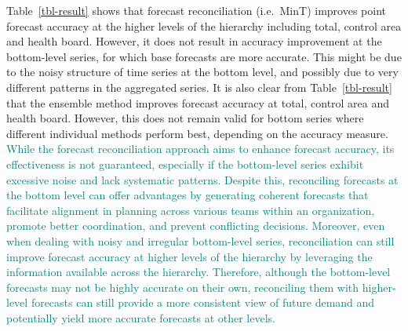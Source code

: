 \documentclass[
  authoryear,
  preprint,
  3p]{elsarticle}
\begin{document}
Table~\ref{tbl-result} shows that forecast reconciliation (i.e.~MinT)
improves point forecast accuracy at the higher levels of the hierarchy
including total, control area and health board. However, it does not
result in accuracy improvement at the bottom-level series, for which
base forecasts are more accurate. This might be due to the noisy
structure of time series at the bottom level, and possibly due to very
different patterns in the aggregated series. It is also clear from
Table~\ref{tbl-result} that the ensemble method improves forecast
accuracy at total, control area and health board. However, this does not
remain valid for bottom series where different individual methods
perform best, depending on the accuracy measure.
\textcolor{teal}{While the forecast reconciliation approach aims to enhance forecast accuracy, its effectiveness is not guaranteed, especially if the bottom-level series exhibit excessive noise and lack systematic patterns. Despite this, reconciling forecasts at the bottom level can offer advantages by generating coherent forecasts that facilitate alignment in planning across various teams within an organization, promote better coordination, and prevent conflicting decisions. Moreover, even when dealing with noisy and irregular bottom-level series, reconciliation can still improve forecast accuracy at higher levels of the hierarchy by leveraging the information available across the hierarchy. Therefore, although the bottom-level forecasts may not be highly accurate on their own, reconciling them with higher-level forecasts can still provide a more consistent view of future demand and potentially yield more accurate forecasts at other levels.}
\end{document}
